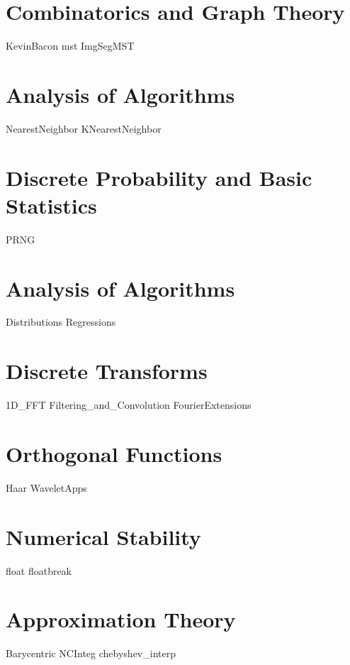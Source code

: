 \documentclass[nociteref]{SIAM-GH-book}
\begin{document}
\part{Combinatorics and Graph Theory}
{KevinBacon}
{mst}
{ImgSegMST}

\part{Analysis of Algorithms}
{NearestNeighbor}
{KNearestNeighbor}

\part{Discrete Probability and Basic Statistics}
{PRNG}


\part{Analysis of Algorithms}
{Distributions}
{Regressions}

\part{Discrete Transforms}
{1D_FFT}
{Filtering_and_Convolution}
{FourierExtensions}

\part{Orthogonal Functions}
{Haar}
{WaveletApps}

\part{Numerical Stability}
{float}
{floatbreak}

\part{Approximation Theory}
{Barycentric}
{NCInteg}
{chebyshev_interp}
\end{document}
